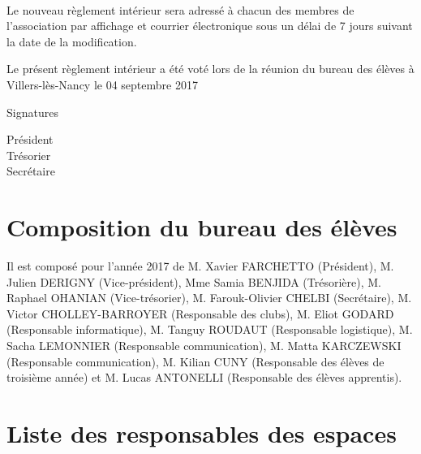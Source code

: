 \documentclass{article} %
\begin{document}
        \paragraph{}
		Le nouveau règlement intérieur sera adressé à chacun des membres de
		l'association par affichage et courrier électronique sous un délai de 7
		jours suivant la date de la modification.

    \vfill
	\begin{center}
		{\large\light{} Le présent règlement intérieur a été voté lors de la réunion
		du bureau des élèves à Villers-lès-Nancy le 04 septembre 2017 }
	\end{center}
	\vfill
	Signatures\par
	\begin{multicols}{3}
	    \begin{center}
	        Président \\
	        Trésorier \\
	        Secrétaire
	    \end{center}
	\end{multicols}
	\vspace{3cm}
	\clearpage

	\section*{Composition du bureau des élèves}
		
		Il est composé pour l’année 2017 de M. Xavier FARCHETTO (Président), M.
		Julien DERIGNY (Vice-président), Mme Samia BENJIDA (Trésorière), M.
		Raphael OHANIAN (Vice-trésorier), M. Farouk-Olivier CHELBI (Secrétaire), M. Victor
		CHOLLEY-BARROYER (Responsable des clubs), M. Eliot GODARD (Responsable
		informatique), M. Tanguy ROUDAUT (Responsable logistique), M. Sacha
		LEMONNIER (Responsable communication), M. Matta KARCZEWSKI
		(Responsable communication), M. Kilian CUNY (Responsable des élèves
		de troisième année) et M. Lucas ANTONELLI (Responsable des élèves apprentis).

	\section*{Liste des responsables des espaces}
\end{document}
